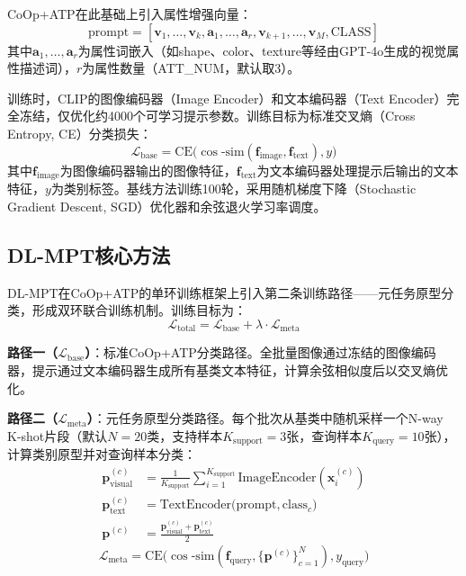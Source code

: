 \documentclass[10pt,a4paper]{ctexart}
\begin{document}
CoOp+ATP在此基础上引入属性增强向量：
\begin{equation}
    \text{prompt} = [\mathbf{v}_1, \ldots, \mathbf{v}_{k}, \mathbf{a}_1, \ldots, \mathbf{a}_r, \mathbf{v}_{k+1}, \ldots, \mathbf{v}_{M}, \text{CLASS}]
\end{equation}
其中$\mathbf{a}_1, \ldots, \mathbf{a}_r$为属性词嵌入（如shape、color、texture等经由GPT-4o生成的视觉属性描述词），$r$为属性数量（ATT\_NUM，默认取3）。

训练时，CLIP的图像编码器（Image Encoder）和文本编码器（Text Encoder）完全冻结，仅优化约4000个可学习提示参数。训练目标为标准交叉熵（Cross Entropy, CE）分类损失：
\begin{equation}
    \mathcal{L}_{\text{base}} = \text{CE}\bigl(\cos\text{-}\text{sim}(\mathbf{f}_{\text{image}}, \mathbf{f}_{\text{text}}), y\bigr)
\end{equation}
其中$\mathbf{f}_{\text{image}}$为图像编码器输出的图像特征，$\mathbf{f}_{\text{text}}$为文本编码器处理提示后输出的文本特征，$y$为类别标签。基线方法训练100轮，采用随机梯度下降（Stochastic Gradient Descent, SGD）优化器和余弦退火学习率调度。

\subsection{DL-MPT核心方法}

DL-MPT在CoOp+ATP的单环训练框架上引入第二条训练路径——元任务原型分类，形成双环联合训练机制。训练目标为：
\begin{equation}
    \mathcal{L}_{\text{total}} = \mathcal{L}_{\text{base}} + \lambda \cdot \mathcal{L}_{\text{meta}}
\end{equation}

\textbf{路径一（$\mathcal{L}_{\text{base}}$）}：标准CoOp+ATP分类路径。全批量图像通过冻结的图像编码器，提示通过文本编码器生成所有基类文本特征，计算余弦相似度后以交叉熵优化。

\textbf{路径二（$\mathcal{L}_{\text{meta}}$）}：元任务原型分类路径。每个批次从基类中随机采样一个N-way K-shot片段（默认$N{=}20$类，支持样本$K_{\text{support}}{=}3$张，查询样本$K_{\text{query}}{=}10$张），计算类别原型并对查询样本分类：
\begin{align}
    \mathbf{p}_{\text{visual}}^{(c)} &= \frac{1}{K_{\text{support}}} \sum_{i=1}^{K_{\text{support}}} \text{ImageEncoder}(\mathbf{x}_i^{(c)}) \\
    \mathbf{p}_{\text{text}}^{(c)} &= \text{TextEncoder}\bigl(\text{prompt}, \text{class}_c\bigr) \\
    \mathbf{p}^{(c)} &= \frac{\mathbf{p}_{\text{visual}}^{(c)} + \mathbf{p}_{\text{text}}^{(c)}}{2}
\end{align}
\begin{equation}
    \mathcal{L}_{\text{meta}} = \text{CE}\bigl(\cos\text{-}\text{sim}(\mathbf{f}_{\text{query}}, \{\mathbf{p}^{(c)}\}_{c=1}^{N}), y_{\text{query}}\bigr)
\end{equation}
\end{document}
